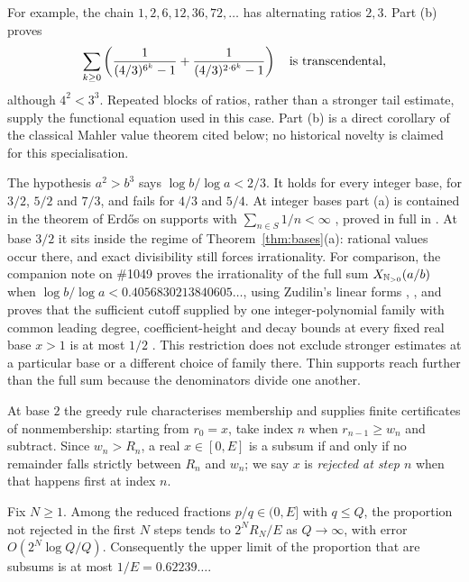 \documentclass[11pt]{article}
\begin{document}
For example, the chain $1,2,6,12,36,72,\ldots$ has alternating ratios
$2,3$. Part (b) proves
\[
 \sum_{k\ge0}\left(\frac1{(4/3)^{6^k}-1}
                  +\frac1{(4/3)^{2\cdot6^k}-1}\right)
 \quad\hbox{is transcendental},
\]
although $4^2<3^3$. Repeated blocks of ratios, rather than a stronger
tail estimate, supply the functional equation used in this case.
Part (b) is a direct corollary of the classical Mahler value theorem cited
below; no historical novelty is claimed for this specialisation.

The hypothesis $a^2>b^3$ says $\log b/\log a<2/3$.  It holds for every integer
base, for $3/2$, $5/2$ and $7/3$, and fails for $4/3$ and $5/4$.  At integer
bases part (a) is contained in the theorem of Erd\H{o}s on supports with
$\sum_{n\in S}1/n<\infty$ \cite{erdos1968}, proved in full in
\cite[Theorem~2]{plectis257}.  At base $3/2$ it sits inside the regime of
Theorem~\ref{thm:bases}(a): rational values occur there, and exact divisibility
still forces irrationality.  For comparison, the companion note on \#1049 proves the irrationality of the
full sum $X_{\mathbb{N}_{>0}}(a/b)$ when $\log b/\log a<0.4056830213840605\ldots$, using Zudilin's
linear forms \cite[Theorem~1]{plectis1049}, \cite{zudilin2004}, and proves that
the sufficient cutoff supplied by one integer-polynomial family with common
leading degree, coefficient-height and decay bounds at every fixed real base
$x>1$ is at most $1/2$ \cite[Theorem~5]{plectis1049}.  This restriction does not
exclude stronger estimates at a particular base or a different choice of
family there.  Thin supports reach further than the full sum
because the denominators divide one another.

At base $2$ the greedy rule characterises membership and supplies finite
certificates of nonmembership: starting from $r_0=x$, take
index $n$ when $r_{n-1}\ge w_n$ and subtract.  Since $w_n>R_n$, a real
$x\in[0,E]$ is a subsum if and only if no remainder falls strictly between
$R_n$ and $w_n$; we say $x$ is \emph{rejected at step $n$} when that happens
first at index $n$.

\begin{theorem}\label{thm:forced}
Fix $N\ge1$.  Among the reduced fractions $p/q\in(0,E]$ with $q\le Q$, the
proportion not rejected in the first $N$ steps tends to $2^NR_N/E$ as
$Q\to\infty$, with error $O(2^N\log Q/Q)$.  Consequently the upper limit of
the proportion that are subsums is at most $1/E=0.62239\ldots$.
\end{theorem}
\end{document}
